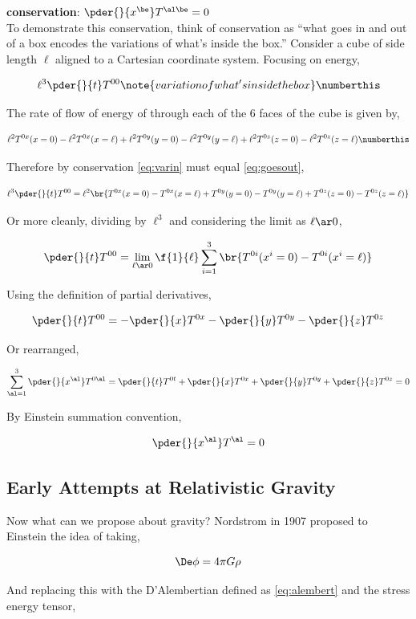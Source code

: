 \documentclass{article}
\begin{document}
\textbf{conservation}: $\pder{}{x^\be} T^{\al\be} = 0$ \\

To demonstrate this conservation, think of conservation as ``what goes in and out of a box encodes the variations of what's inside the box.'' Consider a cube of side length $\ell$ aligned to a Cartesian coordinate system. Focusing on energy,

\[ \ell^3 \pder{}{t} T^{00} \note{variation of what's inside the box} \numberthis \label{eq:varin} \]

The rate of flow of energy of through each of the 6 faces of the cube is given by,

\[ \ell^2 T^{0x}(x=0) - \ell^2T^{0x}(x=\ell) + \ell^2 T^{0y}(y=0) - \ell^2T^{0y}(y=\ell) + \ell^2 T^{0z}(z=0) - \ell^2T^{0z}(z=\ell) \numberthis \label{eq:goesout} \]

Therefore by conservation \eqref{eq:varin} must equal \eqref{eq:goesout},

\[ \ell^3 \pder{}{t} T^{00} = \ell^2 \br{T^{0x}(x=0) - T^{0x}(x=\ell) +  T^{0y}(y=0) - T^{0y}(y=\ell) +  T^{0z}(z=0) - T^{0z}(z=\ell)} \]

Or more cleanly, dividing by $\ell^3$ and considering the limit as $\ell \ar 0$,

\[ \pder{}{t} T^{00} = \lim_{\ell \ar 0} \f{1}{\ell} \sum_{i=1}^{3} \br{T^{0i} (x^i = 0) - T^{0i} (x^i = \ell)} \]

Using the definition of partial derivatives,

\[ \pder{}{t} T^{00} = -\pder{}{x}T^{0x}-\pder{}{y}T^{0y}-\pder{}{z}T^{0z} \]

Or rearranged,

\[ \sum_{\al=1}^{3} \pder{}{x^\al}T^{0\al} = \pder{}{t} T^{0t} + \pder{}{x}T^{0x} + \pder{}{y}T^{0y} + \pder{}{z}T^{0z} = 0 \]

By Einstein summation convention,

\[ \pder{}{x^\al}T^{\al} = 0 \]

\subsection{Early Attempts at Relativistic Gravity}

Now what can we propose about gravity? Nordstrom in 1907 proposed to Einstein the idea of taking,

\[ \De \phi = 4 \pi G \rho \]

And replacing this with the D'Alembertian defined as \eqref{eq:alembert} and the stress energy tensor,
\end{document}
